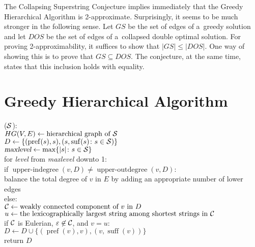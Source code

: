 \documentclass[11pt,letterpaper]{article}
\DeclareMathOperator{\pref}{pref}
\DeclareMathOperator{\suff}{suff}
\begin{document}
The Collapsing Superstring Conjecture implies immediately that the Greedy
Hierarchical Algorithm is 2-approximate. Surprisingly, it seems to be much
stronger in the following sense. Let $GS$ be the set of edges of a~greedy
solution and let $DOS$ be the set of edges of a~collapsed double optimal
solution. For proving 2-approximability, it suffices to show that $|GS| \le |DOS|$. 
One way of showing this is to prove that $GS \subseteq DOS$. 
The conjecture, at the same time, states that this inclusion holds with equality.

\clearpage
\section{Greedy Hierarchical Algorithm}

(${\cal S}$):\\
$HG(V,E) \gets \text{hierarchical graph of ${\cal S}$}$\\
$D \gets \{(\operatorname{pref}(s), s), (s, \operatorname{suf}(s) \colon s \in {\cal S})\}$\\
$\textsl{maxlevel} \gets \max\{|s| \colon s \in {\cal S}\}$\\
for \textsl{level} from \textsl{maxlevel} downto 1:\\
\null\quad if $\operatorname{upper-indegree}(v, D) \neq \operatorname{upper-outdegree}(v, D)$:\\
\null\quad\quad balance the total degree of $v$ in $E$ by adding an appropriate number of lower edges \\
\null\quad else:\\
\null\quad\quad ${\cal C} \gets \text{weakly connected component of $v$ in $D$}$\\
\null\quad\quad $u \gets \text{the lexicographically largest string among shortest strings in ${\cal C}$}$\\
\null\quad\quad if ${\cal C}$ is Eulerian, $\varepsilon \not \in {\cal C}$, and $v = u$:\\
\null\quad\quad\quad $D \gets D \cup \{(\pref(v), v), (v, \suff(v))\}$\\
return $D$

\end{document}
